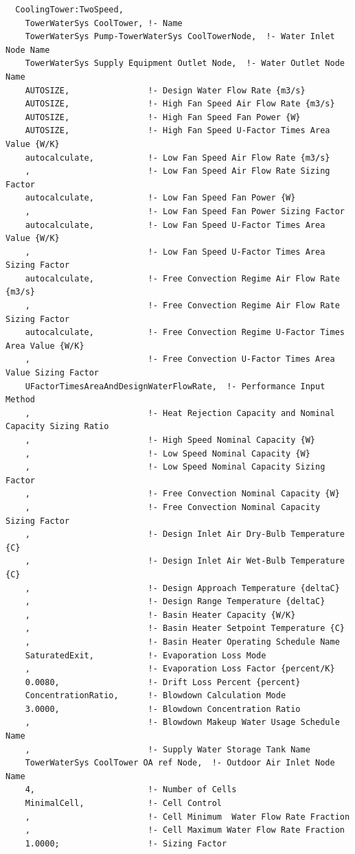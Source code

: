 \begin{lstlisting}
  CoolingTower:TwoSpeed,
    TowerWaterSys CoolTower, !- Name
    TowerWaterSys Pump-TowerWaterSys CoolTowerNode,  !- Water Inlet Node Name
    TowerWaterSys Supply Equipment Outlet Node,  !- Water Outlet Node Name
    AUTOSIZE,                !- Design Water Flow Rate {m3/s}
    AUTOSIZE,                !- High Fan Speed Air Flow Rate {m3/s}
    AUTOSIZE,                !- High Fan Speed Fan Power {W}
    AUTOSIZE,                !- High Fan Speed U-Factor Times Area Value {W/K}
    autocalculate,           !- Low Fan Speed Air Flow Rate {m3/s}
    ,                        !- Low Fan Speed Air Flow Rate Sizing Factor
    autocalculate,           !- Low Fan Speed Fan Power {W}
    ,                        !- Low Fan Speed Fan Power Sizing Factor
    autocalculate,           !- Low Fan Speed U-Factor Times Area Value {W/K}
    ,                        !- Low Fan Speed U-Factor Times Area Sizing Factor
    autocalculate,           !- Free Convection Regime Air Flow Rate {m3/s}
    ,                        !- Free Convection Regime Air Flow Rate Sizing Factor
    autocalculate,           !- Free Convection Regime U-Factor Times Area Value {W/K}
    ,                        !- Free Convection U-Factor Times Area Value Sizing Factor
    UFactorTimesAreaAndDesignWaterFlowRate,  !- Performance Input Method
    ,                        !- Heat Rejection Capacity and Nominal Capacity Sizing Ratio
    ,                        !- High Speed Nominal Capacity {W}
    ,                        !- Low Speed Nominal Capacity {W}
    ,                        !- Low Speed Nominal Capacity Sizing Factor
    ,                        !- Free Convection Nominal Capacity {W}
    ,                        !- Free Convection Nominal Capacity Sizing Factor
    ,                        !- Design Inlet Air Dry-Bulb Temperature {C}
    ,                        !- Design Inlet Air Wet-Bulb Temperature {C}
    ,                        !- Design Approach Temperature {deltaC}
    ,                        !- Design Range Temperature {deltaC}
    ,                        !- Basin Heater Capacity {W/K}
    ,                        !- Basin Heater Setpoint Temperature {C}
    ,                        !- Basin Heater Operating Schedule Name
    SaturatedExit,           !- Evaporation Loss Mode
    ,                        !- Evaporation Loss Factor {percent/K}
    0.0080,                  !- Drift Loss Percent {percent}
    ConcentrationRatio,      !- Blowdown Calculation Mode
    3.0000,                  !- Blowdown Concentration Ratio
    ,                        !- Blowdown Makeup Water Usage Schedule Name
    ,                        !- Supply Water Storage Tank Name
    TowerWaterSys CoolTower OA ref Node,  !- Outdoor Air Inlet Node Name
    4,                       !- Number of Cells
    MinimalCell,             !- Cell Control
    ,                        !- Cell Minimum  Water Flow Rate Fraction
    ,                        !- Cell Maximum Water Flow Rate Fraction
    1.0000;                  !- Sizing Factor

\end{lstlisting}

